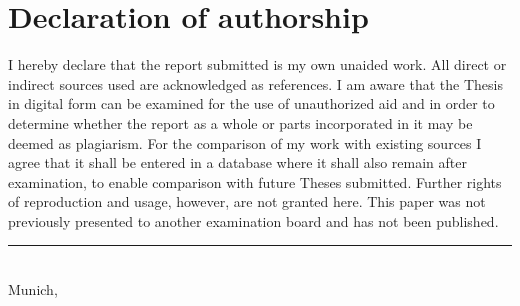 \newpage

\section*{Declaration of authorship}
\thispagestyle{empty}
\vspace{-1cm}

\vspace{2cm} I hereby declare that the report submitted is my own unaided work. All direct or indirect sources used
are acknowledged as references. I am aware that the Thesis in digital form can be examined for the use of unauthorized
aid and in order to determine whether the report as a whole or parts incorporated in it may be deemed as plagiarism.
For the comparison of my work with existing sources I agree that it shall be entered in a database where it shall also
remain after examination, to enable comparison with future Theses submitted. Further rights of reproduction and usage,
however, are not granted here. This paper was not previously presented to another examination board and has not been
published.

\vspace{3cm}
\hfill\rule{6cm}{0.4pt}\\
\noindent Munich, \dueday~\duemonth~\dueyear \hfill \myname
\cleardoublepage
